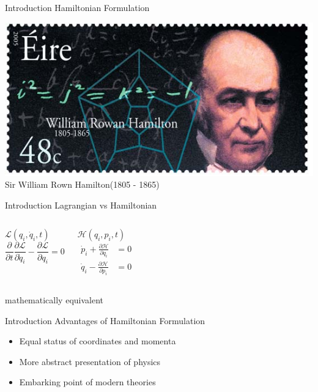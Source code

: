 \documentclass[xcolor=dvipsnames]{beamer}
\begin{document}
	\begin{frame}{Introduction}
		Hamiltonian Formulation
		\begin{center}
			\includegraphics[scale=1.0]{hamilton.jpg}\\
			\tiny{Sir William Rown Hamilton(1805 - 1865)}
		\end{center}
	\end{frame}
	\begin{frame}{Introduction}
		Lagrangian vs Hamiltonian
		\begin{columns}[c]
			\column{2in}
			\begin{center}
				$\mathcal{L}(q_{i}, {\dot q}_{i}, t)$
				\begin{equation*}
					\frac{\partial}{\partial t}\frac{\partial \mathcal{L}}{\partial {\dot q_{i}}} - \frac{\partial \mathcal{L}}{\partial q_{i}} = 0
				\end{equation*}	
			\end{center}
			\column{2in}
			\begin{center}
				$\mathcal{H}(q_{i}, p_{i}, t)$	
				\begin{align*}
					{\dot p}_{i} + \frac{\partial \mathcal{H}}{\partial q_{i}} &= 0	\\
					{\dot q}_{i} - \frac{\partial \mathcal{H}}{\partial p_{i}} &= 0
				\end{align*}
			\end{center}
		\end{columns}
		\pause
		\begin{center}
			\Large{mathematically equivalent}
		\end{center}
	\end{frame}
	\begin{frame}{Introduction}
		Advantages of Hamiltonian Formulation
		\begin{itemize}
			\item{Equal status of coordinates and momenta}
			\item{More abstract presentation of physics}
			\item{Embarking point of modern theories}
		\end{itemize}
	\end{frame}
\end{document}
